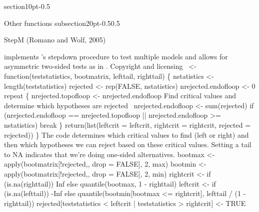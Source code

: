 \documentclass[10pt]{article}%
\makeatletter
\newcommand\citepos[2][]{\citeauthor{#2}'s \citeyearpar[#1]{#2}}
\renewcommand\section{\@startsection%
{section}{1}{0pt}{-\baselineskip}{0.5\baselineskip}%
{\normalfont\normalsize\bfseries\large\raggedright}}
\renewcommand\subsection{\@startsection%
{subsection}{2}{0pt}{-0.5\baselineskip}{0.5\baselineskip}%
{\normalfont\normalsize\bfseries\small\raggedright}}
\makeatother
\begin{document}
\section{Other functions}
\subsection{StepM (Romano and Wolf, 2005)} 

{\Tt{}\nwendquote} implements \citepos{RoW:05} stepdown procedure to test
multiple models and allows for asymmetric two-sided tests as in
\citet{Cal:11e}.
\nwenddocs{}\endmoddef\nwstartdeflinemarkup\nwenddeflinemarkup
\LA{}Copyright and licensing~{\nwtagstyle{}}\RA{}
 <- function(teststatistics, bootmatrix, lefttail, righttail) \{
  nstatistics <- length(teststatistics)
  rejected <- rep(FALSE, nstatistics)
  nrejected.endofloop <- 0
  repeat \{
    nrejected.topofloop <- nrejected.endofloop
    \LA{}Find critical values and determine which hypotheses are rejected~{\nwtagstyle{}}\RA{}
    nrejected.endofloop <- sum(rejected)
    if (nrejected.endofloop == nrejected.topofloop ||
        nrejected.endofloop >= nstatistics) break
  \}
  return(list(leftcrit = leftcrit, rightcrit = rightcrit, 
              rejected = rejected))
\}
\eatline
{}\nwendcode{}\nwdocspar
The code determines which critical values to find (left or right) and
then which hypotheses we can reject based on these critical values.
Setting a tail to {\Tt{}NA\nwendquote} indicates that we're doing one-sided
alternatives.
\nwenddocs{}\endmoddef\nwstartdeflinemarkup{}\nwenddeflinemarkup
bootmax <- apply(bootmatrix[!rejected,, drop = FALSE], 2, max)
bootmin <- apply(bootmatrix[!rejected,, drop = FALSE], 2, min)
rightcrit <- if (is.na(righttail)) Inf else 
               quantile(bootmax, 1 - righttail)
leftcrit <- if (is.na(lefttail)) -Inf else 
              quantile(bootmin[bootmax <= rightcrit], 
                       lefttail / (1 - righttail))
rejected[teststatistics < leftcrit | teststatistics > rightcrit] <- TRUE
\nwendcode{}\nwdocspar
\end{document}

